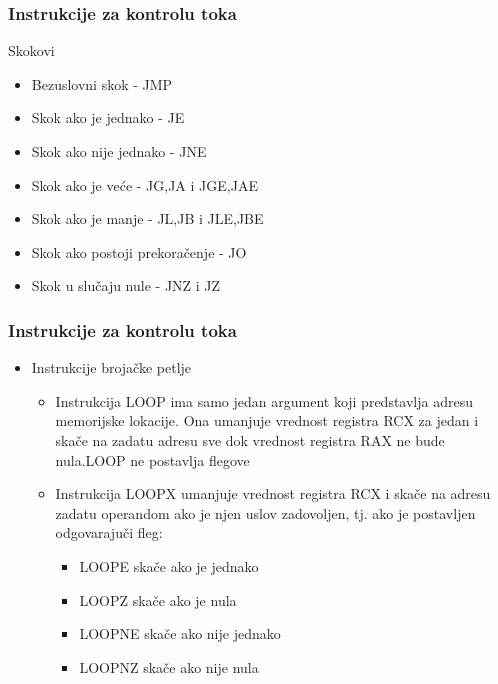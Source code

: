 \documentclass[hyperref={pdfpagelabels=false}]{beamer}
\begin{document}
	\begin{frame}
		\frametitle{Instrukcije za kontrolu toka}
		Skokovi
		\begin{itemize}
			\item Bezuslovni skok - JMP 
			\item Skok ako je jednako - JE
			\item Skok ako nije jednako - JNE
			\item Skok ako je ve\' ce - JG,JA i JGE,JAE
			\item Skok ako je manje - JL,JB i JLE,JBE
			\item Skok ako postoji prekora\v cenje - JO
			\item Skok u slu\v caju nule - JNZ i JZ		
		\end{itemize}
	\end{frame}
	
	\begin{frame}
		\frametitle{Instrukcije za kontrolu toka}
		\begin{itemize}
			\item Instrukcije broja\v cke petlje\pause
				\begin{itemize}
					\item Instrukcija LOOP ima samo jedan argument koji predstavlja adresu memorijske lokacije. Ona umanjuje vrednost registra RCX za jedan i ska\v ce
					na zadatu adresu sve dok vrednost registra RAX ne bude nula.LOOP ne postavlja flegove \pause
					\item Instrukcija LOOPX umanjuje vrednost registra RCX i ska\v ce na adresu zadatu operandom ako je njen uslov zadovoljen, tj. ako je postavljen
					odgovaraju\v ci fleg:
						\begin{itemize}
							\item LOOPE ska\v ce ako je jednako
							\item LOOPZ ska\v ce ako je nula
							\item LOOPNE ska\v ce ako nije jednako
							\item LOOPNZ ska\v ce ako nije nula
						\end{itemize}
				\end{itemize}
		\end{itemize}
	\end{frame}
				
\end{document}
